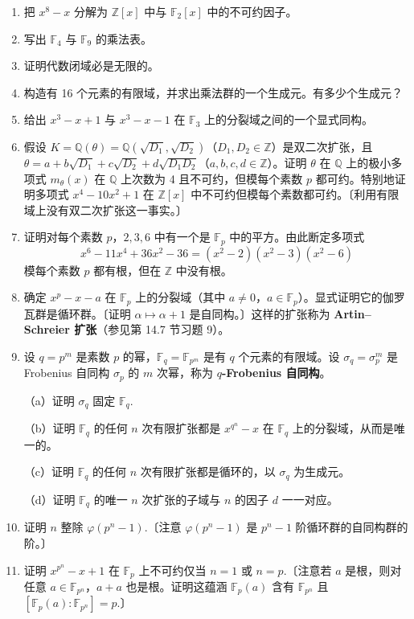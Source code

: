 \begin{enumerate}
\item 把 \(x^8-x\) 分解为 \(\mathbb{Z}[x]\) 中与 \(\mathbb{F}_2[x]\) 中的不可约因子。

\item 写出 \(\mathbb{F}_4\) 与 \(\mathbb{F}_9\) 的乘法表。

\item 证明代数闭域必是无限的。

\item 构造有 16 个元素的有限域，并求出乘法群的一个生成元。有多少个生成元？

\item 给出 \(x^3-x+1\) 与 \(x^3-x-1\) 在 \(\mathbb{F}_3\) 上的分裂域之间的一个显式同构。

\item 假设 \(K = \mathbb{Q}(\theta) = \mathbb{Q}(\sqrt{D_1}, \sqrt{D_2})\)（\(D_1, D_2 \in \mathbb{Z}\)）是双二次扩张，且 \(\theta = a+b\sqrt{D_1}+c\sqrt{D_2}+d\sqrt{D_1D_2}\)（\(a, b, c, d \in \mathbb{Z}\)）。证明 \(\theta\) 在 \(\mathbb{Q}\) 上的极小多项式 \(m_\theta(x)\) 在 \(\mathbb{Q}\) 上次数为 4 且不可约，但模每个素数 \(p\) 都可约。特别地证明多项式 \(x^4-10x^2+1\) 在 \(\mathbb{Z}[x]\) 中不可约但模每个素数都可约。〔利用有限域上没有双二次扩张这一事实。〕

\item 证明对每个素数 \(p\)，\(2, 3, 6\) 中有一个是 \(\mathbb{F}_p\) 中的平方。由此断定多项式
\[
x^6-11x^4+36x^2-36 = (x^2-2)(x^2-3)(x^2-6)
\]
模每个素数 \(p\) 都有根，但在 \(\mathbb{Z}\) 中没有根。

\item 确定 \(x^p-x-a\) 在 \(\mathbb{F}_p\) 上的分裂域（其中 \(a \neq 0\)，\(a \in \mathbb{F}_p\)）。显式证明它的伽罗瓦群是循环群。〔证明 \(\alpha \mapsto \alpha+1\) 是自同构。〕这样的扩张称为 \textbf{Artin--Schreier 扩张}（参见第 14.7 节习题 9）。

\item 设 \(q = p^m\) 是素数 \(p\) 的幂，\(\mathbb{F}_q = \mathbb{F}_{p^m}\) 是有 \(q\) 个元素的有限域。设 \(\sigma_q = \sigma_p^m\) 是 Frobenius 自同构 \(\sigma_p\) 的 \(m\) 次幂，称为 \textbf{\(q\)-Frobenius 自同构}。

（a）证明 \(\sigma_q\) 固定 \(\mathbb{F}_q\).

（b）证明 \(\mathbb{F}_q\) 的任何 \(n\) 次有限扩张都是 \(x^{q^n}-x\) 在 \(\mathbb{F}_q\) 上的分裂域，从而是唯一的。

（c）证明 \(\mathbb{F}_q\) 的任何 \(n\) 次有限扩张都是循环的，以 \(\sigma_q\) 为生成元。

（d）证明 \(\mathbb{F}_q\) 的唯一 \(n\) 次扩张的子域与 \(n\) 的因子 \(d\) 一一对应。

\item 证明 \(n\) 整除 \(\varphi(p^n-1)\).〔注意 \(\varphi(p^n-1)\) 是 \(p^n-1\) 阶循环群的自同构群的阶。〕

\item 证明 \(x^{p^n}-x+1\) 在 \(\mathbb{F}_p\) 上不可约仅当 \(n = 1\) 或 \(n = p\).〔注意若 \(a\) 是根，则对任意 \(a \in \mathbb{F}_{p^n}\)，\(a+a\) 也是根。证明这蕴涵 \(\mathbb{F}_p(a)\) 含有 \(\mathbb{F}_{p^n}\) 且 \([\mathbb{F}_p(a):\mathbb{F}_{p^n}] = p\).〕
\end{enumerate}

